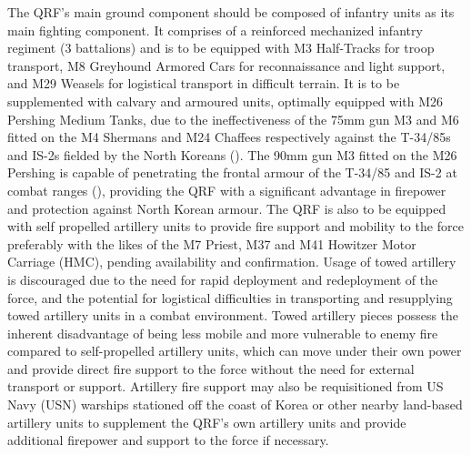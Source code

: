 \documentclass[a4paper,12pt]{article}
\begin{document}
{	The QRF's main ground component should be composed of infantry units as its main fighting component. It comprises of a reinforced mechanized infantry regiment (3 battalions) and is to be equipped with M3 Half-Tracks for troop transport, M8 Greyhound Armored Cars for reconnaissance and light support, and M29 Weasels for logistical transport in difficult terrain. It is to be supplemented with calvary and armoured units, optimally equipped with M26 Pershing Medium Tanks, due to the ineffectiveness of the 75mm gun M3 and M6 fitted on the M4 Shermans and M24 Chaffees respectively against the T-34/85s and IS-2s fielded by the North Koreans (\cite{bird2001world}). The 90mm gun M3 fitted on the M26 Pershing is capable of penetrating the frontal armour of the T-34/85 and IS-2 at combat ranges (\cite{bird2001world}), providing the QRF with a significant advantage in firepower and protection against North Korean armour. The QRF is also to be equipped with self propelled artillery units to provide fire support and mobility to the force preferably with the likes of the M7 Priest, M37 and M41 Howitzer Motor Carriage (HMC), pending availability and confirmation. Usage of towed artillery is discouraged due to the need for rapid deployment and redeployment of the force, and the potential for logistical difficulties in transporting and resupplying towed artillery units in a combat environment. Towed artillery pieces possess the inherent disadvantage of being less mobile and more vulnerable to enemy fire compared to self-propelled artillery units, which can move under their own power and provide direct fire support to the force without the need for external transport or support. Artillery fire support may also be requisitioned from US Navy (USN) warships stationed off the coast of Korea or other nearby land-based artillery units to supplement the QRF's own artillery units and provide additional firepower and support to the force if necessary.
	\\
}
\end{document}
